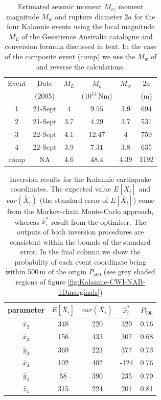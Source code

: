 \documentclass[grl]{agutex}
\begin{document}
\begin{table}
\caption[Kalannie earthquake magnitudes, seismic moments and dimensions]
{Estimated seismic moment $M_o$, moment magnitude $M_w$ and rupture diameter $2a$ for the
four Kalannie events using the local magnitude $M_L$ of the Geoscience Australia catalogue and conversion
formula discussed in text. In the case of the composite event (comp) we use the $M_w$ of \citet{dr_Dawson08a} and reverse
the calculations.}
\label{tab:Kalannie-eventsizes}
\begin{tabular}{c|ccccc}
\hline
Event & Date     & $M_L$ & $M_o$           & $M_w$   &  $2a$\\
      & (2005)   &       & ($10^{14}$\,Nm) &         &  (m)\\
\hline
1     &  21-Sept & 4     & $9.55$          & 3.9     & 694\\
2     &  21-Sept & 3.7   & $4.29$          & 3.7     & 531\\
3     &  22-Sept  & 4.1  & $12.47$         & 4       & 759\\
4     &  22-Sept  & 3.9  & $7.31$          & 3.8     & 635\\
comp  &  NA       & 4.6  & $48.4$          & 4.39    & 1192\\
\hline
\end{tabular}
\end{table}


\begin{table}
\caption{Inversion results for the Kalannie earthquake coordinates. The expected value $E[\bar{X}_i]$
and $var(\bar{X}_i)$ (the standard error of $E[\bar{X}_i]$) come from the Markov-chain Monte-Carlo approach, whereas
$\hat{x}_i^*$ result from the optimiser. The
outputs of both inversion procedures are consistent within the bounds of the standard error.
In the final column we show the probability of each event coordinate being within 500\,m of the origin $P_{500}$ (see grey
shaded regions of figure \ref{fig:Kalannie-CWI-NAB-1Dmarginals})}
\label{tab:Kalannie-InversionRes}
\renewcommand{\arraystretch}{1.5}
\begin{tabular}{c|cc|c|c}
\hline
parameter & $E[\bar{X}_i]$ &  $var(\bar{X}_i)$  & $\hat{x}_i^*$ & $P_{500}$\\
\hline
$\hat{x}_2$ & 348 & 220 & 329 & 0.76 \\
\hline
$\hat{x}_3$ & 156 & 433 & 307 & 0.68\\
$\hat{y}_3$ & 369 & 223 & 377 & 0.73\\
\hline
$\hat{x}_4$ & 102 & 402 & -124 & 0.76\\
$\hat{y}_4$ & 58 & 390 & 235 & 0.79\\
$\hat{z}_4$ & 315 & 224 & 201 & 0.81\\
\hline
\end{tabular}
\renewcommand{\arraystretch}{1}
\end{table}
\end{document}
